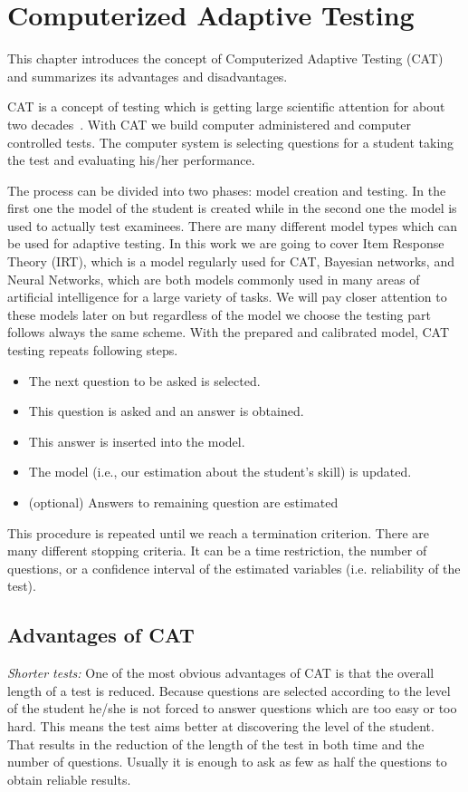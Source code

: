 \chapter{Computerized Adaptive Testing}
This chapter introduces the concept of Computerized Adaptive Testing (CAT) and summarizes its advantages and disadvantages.
 
CAT is a concept of testing which is getting large scientific attention for about two decades~\cite{Linden2000, Wainer1990, VanderLinden2010}. With CAT we build computer administered and computer controlled tests. The computer system is selecting questions for a student taking the test and evaluating his/her performance. 


The process can be divided into two phases: model creation and testing. In the first one the model of the student is created while in the second one the model is used to actually test examinees. There are many different model types which can be used for adaptive testing. In this work we are going to cover Item Response Theory (IRT), which is a model regularly used for CAT, Bayesian networks, and Neural Networks, which are both models commonly used in many areas of artificial intelligence for a large variety of tasks. We will pay closer attention to these models later on but regardless of the model we choose the testing part follows always the same scheme. With the prepared and calibrated model, CAT testing repeats following steps.

\label{sec:CATprocess}
\begin{itemize}
	\item The next question to be asked is selected.
	\item This question is asked and an answer is obtained.
	\item This answer is inserted into the model.
	\item The model (i.e., our estimation about the student's skill) is updated.
	\item (optional) Answers to remaining question are estimated
\end{itemize}

This procedure is repeated until we reach a termination criterion. There are many different stopping criteria. It can be a time restriction, the number of questions, or a confidence interval of the estimated variables (i.e. reliability of the test).

\section{Advantages of CAT}
\emph{Shorter tests:} One of the most obvious advantages of CAT is that the overall length of a test is reduced. Because questions are selected according to the level of the student he/she is not forced to answer questions which are too easy or too hard. This means the test aims better at discovering the level of the student. That results in the reduction of the length of the test in both time and the number of questions. Usually it is enough to ask as few as half the questions to obtain reliable results. 

